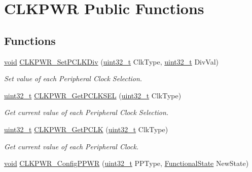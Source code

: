 \hypertarget{group___c_l_k_p_w_r___public___functions}{}\section{C\+L\+K\+P\+WR Public Functions}
\label{group___c_l_k_p_w_r___public___functions}
\subsection*{Functions}
\begin{DoxyCompactItemize}
\item 
\hyperlink{usb__devapi_8h_afabf60e7f57651d6d595a02c75f07cd0}{void} \hyperlink{group___c_l_k_p_w_r___public___functions_ga4e68fb4cf5c06c32b6ee6aea8dbaf78c}{C\+L\+K\+P\+W\+R\+\_\+\+Set\+P\+C\+L\+K\+Div} (\hyperlink{_p_e___types_8h_a33594304e786b158f3fb30289278f5af}{uint32\+\_\+t} Clk\+Type, \hyperlink{_p_e___types_8h_a33594304e786b158f3fb30289278f5af}{uint32\+\_\+t} Div\+Val)
\begin{DoxyCompactList}\small\item\em Set value of each Peripheral Clock Selection. \end{DoxyCompactList}\item 
\hyperlink{_p_e___types_8h_a33594304e786b158f3fb30289278f5af}{uint32\+\_\+t} \hyperlink{group___c_l_k_p_w_r___public___functions_ga2afcbf9f69a8c416a154969a1e7b2935}{C\+L\+K\+P\+W\+R\+\_\+\+Get\+P\+C\+L\+K\+S\+EL} (\hyperlink{_p_e___types_8h_a33594304e786b158f3fb30289278f5af}{uint32\+\_\+t} Clk\+Type)
\begin{DoxyCompactList}\small\item\em Get current value of each Peripheral Clock Selection. \end{DoxyCompactList}\item 
\hyperlink{_p_e___types_8h_a33594304e786b158f3fb30289278f5af}{uint32\+\_\+t} \hyperlink{group___c_l_k_p_w_r___public___functions_ga1eea2e1c8aac99147b88d5c18928ffa8}{C\+L\+K\+P\+W\+R\+\_\+\+Get\+P\+C\+LK} (\hyperlink{_p_e___types_8h_a33594304e786b158f3fb30289278f5af}{uint32\+\_\+t} Clk\+Type)
\begin{DoxyCompactList}\small\item\em Get current value of each Peripheral Clock. \end{DoxyCompactList}\item 
\hyperlink{usb__devapi_8h_afabf60e7f57651d6d595a02c75f07cd0}{void} \hyperlink{group___c_l_k_p_w_r___public___functions_gac29f7879a37c604a1040499001ba0121}{C\+L\+K\+P\+W\+R\+\_\+\+Config\+P\+P\+WR} (\hyperlink{_p_e___types_8h_a33594304e786b158f3fb30289278f5af}{uint32\+\_\+t} P\+P\+Type, \hyperlink{agilefox_2library_2inc_2stm32f10x__type_8h_ac9a7e9a35d2513ec15c3b537aaa4fba1}{Functional\+State} New\+State)

\end{DoxyCompactItemize}
